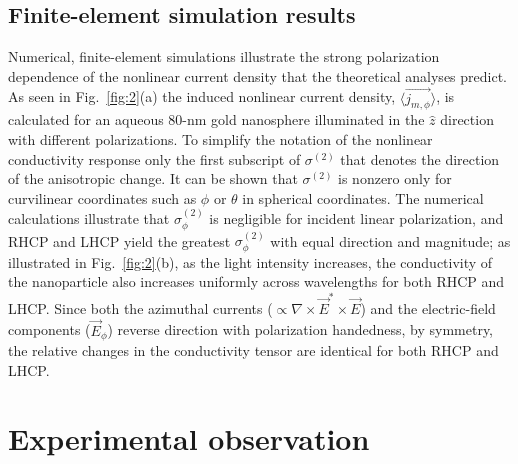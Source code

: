 \subsection{Finite-element simulation results}
\indent Numerical, finite-element simulations illustrate the strong polarization dependence of the nonlinear current density that the theoretical analyses predict. As seen in Fig.~\ref{fig:2}(a) the induced nonlinear current density, $\langle\vec{j_{m,\phi}}\rangle$, is calculated for an aqueous 80-nm gold nanosphere illuminated in the $\hat{z}$ direction with different polarizations. To simplify the notation of the nonlinear conductivity response only the first subscript of $\sigma^{(2)}$ that denotes the direction of the anisotropic change. It can be shown that $\sigma^{(2)}$ is nonzero only for curvilinear coordinates such as $\phi$ or $\theta$ in spherical coordinates. The numerical calculations illustrate that $\sigma^{(2)}_{\phi}$ is negligible for incident linear polarization, and RHCP and LHCP yield the greatest $\sigma^{(2)}_{\phi}$ with equal direction and magnitude; as illustrated in Fig.~\ref{fig:2}(b), as the light intensity increases, the conductivity of the nanoparticle also increases uniformly across wavelengths for both RHCP and LHCP. Since both the azimuthal currents ($\propto \nabla\times\vec{E}^*\times\vec{E}$) and the electric-field components ($\vec{E}_\phi$) reverse direction with polarization handedness, by symmetry, the relative changes in the conductivity tensor are identical for both RHCP and LHCP. 

\section{Experimental observation}
